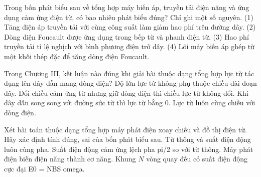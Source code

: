 \begin{ex}
Trong bốn phát biểu sau về tổng hợp máy biến áp, truyền tải điện năng và ứng dụng cảm ứng điện từ, có bao nhiêu phát biểu đúng? Chỉ ghi một số nguyên. (1) Tăng điện áp truyền tải với cùng công suất làm giảm hao phí trên đường dây. (2) Dòng điện Foucault được ứng dụng trong bếp từ và phanh điện từ. (3) Hao phí truyền tải tỉ lệ nghịch với bình phương điện trở dây. (4) Lõi máy biến áp ghép từ một khối thép đặc để tăng dòng điện Foucault.
\end{ex}

\begin{ex}
Trong Chương III, kết luận nào đúng khi giải bài thuộc dạng tổng hợp lực từ tác dụng lên dây dẫn mang dòng điện?
\choice
{Độ lớn lực từ không phụ thuộc chiều dài đoạn dây.}
{Đổi chiều cảm ứng từ nhưng giữ dòng điện thì chiều lực từ không đổi.}
{\True Khi dây dẫn song song với đường sức từ thì lực từ bằng 0.}
{Lực từ luôn cùng chiều với dòng điện.}
\end{ex}

\begin{ex}
Xét bài toán thuộc dạng tổng hợp máy phát điện xoay chiều và đồ thị điện từ. Hãy xác định tính đúng, sai của bốn phát biểu sau.
\choiceTF
{Từ thông và suất điện động luôn cùng pha.}
{\True Suất điện động cảm ứng lệch pha pi/2 so với từ thông.}
{Máy phát điện biến điện năng thành cơ năng.}
{\True Khung $N$ vòng quay đều có suất điện động cực đại E0 = NBS omega.}
\end{ex}

